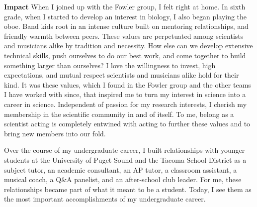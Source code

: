 \textbf{Impact}
When I joined up with the Fowler group, I felt right at home.
In sixth grade, when I started to develop an interest in biology, I also began playing the oboe.
Band kids root in an intense culture built on mentoring relationships, and friendly warmth between peers.
These values are perpetuated among scientists and musicians alike by tradition and necessity.
How else can we develop extensive technical skills, push ourselves to do our best work, and come together to build something larger than ourselves?
I love the willingness to invest, high expectations, and mutual respect scientists and musicians alike hold for their kind.
It was these values, which I found in the Fowler group and the other teams I have worked with since, that inspired me to turn my interest in science into a career in science.
Independent of passion for my research interests, I cherish my membership in the scientific community in and of itself.
To me, belong as a scientist acting is completely entwined with acting to further these values and to bring new members into our fold.

Over the course of my undergraduate career, I built relationships with younger students at the University of Puget Sound and the Tacoma School District as a subject tutor, an academic consultant, an AP tutor, a classroom assistant, a musical coach, a Q\&A panelist, and an after-school club leader.
For me, these relationships became part of what it meant to be a student.
Today, I see them as the most important accomplishments of my undergraduate career.

